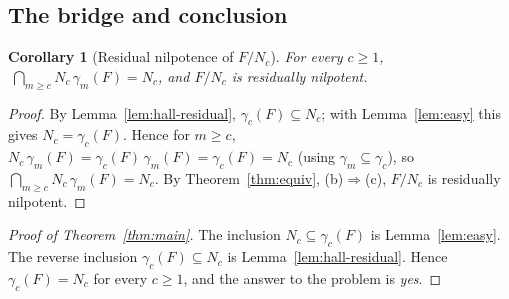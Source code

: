 \documentclass{amsart}
\newtheorem{corollary}{Corollary}
\theoremstyle{definition}
\theoremstyle{remark}
\begin{document}
\subsection{The bridge and conclusion}\label{ssec:bridge}

\begin{corollary}[Residual nilpotence of $F/N_c$]\label{cor:resnil}
For every $c\ge1$, $\ \bigcap_{m\ge c}N_c\,\gamma_m(F)=N_c$, and $F/N_c$ is
residually nilpotent.
\end{corollary}

\begin{proof}
By Lemma~\ref{lem:hall-residual}, $\gamma_c(F)\subseteq N_c$; with
Lemma~\ref{lem:easy} this gives $N_c=\gamma_c(F)$. Hence for $m\ge c$,
$N_c\,\gamma_m(F)=\gamma_c(F)\,\gamma_m(F)=\gamma_c(F)=N_c$ (using
$\gamma_m\subseteq\gamma_c$), so $\bigcap_{m\ge c}N_c\,\gamma_m(F)=N_c$. By
Theorem~\ref{thm:equiv}, (b)$\Rightarrow$(c), $F/N_c$ is residually nilpotent.
\end{proof}

\begin{proof}[Proof of Theorem~\ref{thm:main}]
The inclusion $N_c\subseteq\gamma_c(F)$ is Lemma~\ref{lem:easy}. The reverse
inclusion $\gamma_c(F)\subseteq N_c$ is Lemma~\ref{lem:hall-residual}. Hence
$\gamma_c(F)=N_c$ for every $c\ge1$, and the answer to the problem is \emph{yes}.
\end{proof}
\end{document}
